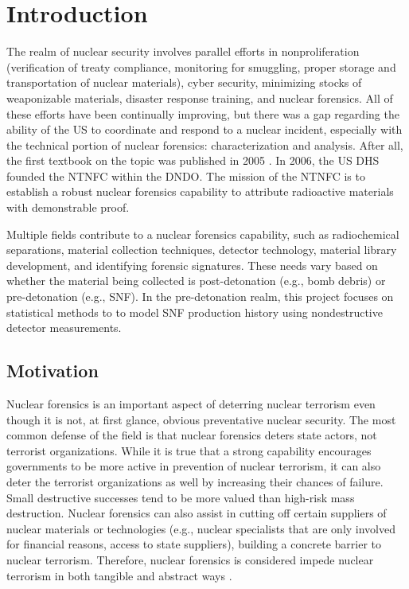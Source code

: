 \chapter{Introduction}
\label{ch:intro}

The realm of nuclear security involves parallel efforts in nonproliferation
(verification of treaty compliance, monitoring for smuggling, proper storage
and transportation of nuclear materials), cyber security, minimizing stocks of
weaponizable materials, disaster response training, and nuclear forensics. All
of these efforts have been continually improving, but there was a gap regarding
the ability of the \gls{US} to coordinate and respond to a nuclear incident,
especially with the technical portion of nuclear forensics: characterization
and analysis. After all, the first textbook on the topic was published in 2005
\cite{nftext_2005}. In 2006, the \gls{US} \gls{DHS} founded the \gls{NTNFC}
within the \gls{DNDO}. The mission of the \gls{NTNFC} is to establish a robust
nuclear forensics capability to attribute radioactive materials with
demonstrable proof.

Multiple fields contribute to a nuclear forensics capability, such as
radiochemical separations, material collection techniques, detector technology,
material library development, and identifying forensic signatures. These needs
vary based on whether the material being collected is post-detonation (e.g.,
bomb debris) or pre-detonation (e.g., \acrfull{SNF}).  In the pre-detonation
realm, this project focuses on statistical methods to to model \gls{SNF}
production history using nondestructive detector measurements. 

\section{Motivation}
\label{sec:motivation}

Nuclear forensics is an important aspect of deterring nuclear terrorism even
though it is not, at first glance, obvious preventative nuclear security.  The
most common defense of the field is that nuclear forensics deters state actors,
not terrorist organizations. While it is true that a strong capability
encourages governments to be more active in prevention of nuclear terrorism, it
can also deter the terrorist organizations as well by increasing their chances
of failure. Small destructive successes tend to be more valued than high-risk
mass destruction. Nuclear forensics can also assist in cutting off certain
suppliers of nuclear materials or technologies (e.g., nuclear specialists that
are only involved for financial reasons, access to state suppliers), building a
concrete barrier to nuclear terrorism.  Therefore, nuclear forensics is
considered impede nuclear terrorism in both tangible and abstract ways
\cite{aps_aaas_forensics}.

